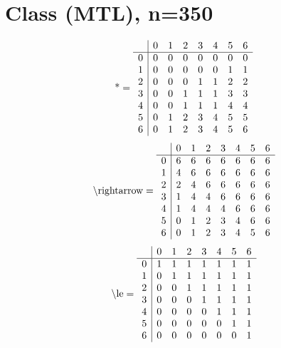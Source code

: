 \documentclass[11pt]{article}
\begin{document}
\section{Class (MTL), n=350}
\[\text{*} = 
\begin{array}{r | r r r r r r r}
 & 0 & 1 & 2 & 3 & 4 & 5 & 6 \\ \hline
0 & 0 & 0 & 0 & 0 & 0 & 0 & 0 \\
1 & 0 & 0 & 0 & 0 & 0 & 1 & 1 \\
2 & 0 & 0 & 0 & 1 & 1 & 2 & 2 \\
3 & 0 & 0 & 1 & 1 & 1 & 3 & 3 \\
4 & 0 & 0 & 1 & 1 & 1 & 4 & 4 \\
5 & 0 & 1 & 2 & 3 & 4 & 5 & 5 \\
6 & 0 & 1 & 2 & 3 & 4 & 5 & 6 \\
\end{array}
\]
\[\text{\textbackslash rightarrow} = 
\begin{array}{r | r r r r r r r}
 & 0 & 1 & 2 & 3 & 4 & 5 & 6 \\ \hline
0 & 6 & 6 & 6 & 6 & 6 & 6 & 6 \\
1 & 4 & 6 & 6 & 6 & 6 & 6 & 6 \\
2 & 2 & 4 & 6 & 6 & 6 & 6 & 6 \\
3 & 1 & 4 & 4 & 6 & 6 & 6 & 6 \\
4 & 1 & 4 & 4 & 4 & 6 & 6 & 6 \\
5 & 0 & 1 & 2 & 3 & 4 & 6 & 6 \\
6 & 0 & 1 & 2 & 3 & 4 & 5 & 6 \\
\end{array}
\]
\[\text{\textbackslash le} = 
\begin{array}{r | r r r r r r r}
 & 0 & 1 & 2 & 3 & 4 & 5 & 6 \\ \hline
0 & 1 & 1 & 1 & 1 & 1 & 1 & 1 \\
1 & 0 & 1 & 1 & 1 & 1 & 1 & 1 \\
2 & 0 & 0 & 1 & 1 & 1 & 1 & 1 \\
3 & 0 & 0 & 0 & 1 & 1 & 1 & 1 \\
4 & 0 & 0 & 0 & 0 & 1 & 1 & 1 \\
5 & 0 & 0 & 0 & 0 & 0 & 1 & 1 \\
6 & 0 & 0 & 0 & 0 & 0 & 0 & 1 \\
\end{array}
\]
\end{document}
